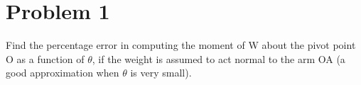 \section*{Problem 1}

Find the percentage error in computing the moment of W about the pivot point O as a function of \( \theta \), if the weight is assumed to act normal to the arm OA (a good approximation when \( \theta \) is very small).
